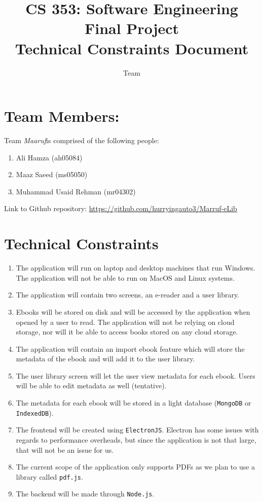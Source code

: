 \documentclass[a4paper, 11pt]{article}
\title{CS 353: Software Engineering \\ {\Large Final Project} \\ {\large Technical Constraints Document}}
\author{Team \Maaruf}
\newcommand{\Maaruf}{\textit{Maaruf}}
\begin{document}
\maketitle
\section{Team Members:}
Team \Maaruf is comprised of the following people:
\begin{enumerate}
    \item Ali Hamza \hspace{5mm} (ah05084)
    \item Maaz Saeed \hspace{5mm} (ms05050)
    \item Muhammad Usaid Rehman  \hspace{3mm} (mr04302)
\end{enumerate}
\vspace{2 mm}
\noindent Link to Github repository: \url{https://github.com/hurryingauto3/Marruf-eLib}

\section{Technical Constraints}


\begin{enumerate}
    \item The application will run on laptop and desktop machines that run Windows. The application will not be able to run on MacOS and Linux systems. 
    \item The application will contain two screens, an e-reader and a user library. 
    \item Ebooks will be stored on disk and will be accessed by the application when opened by a user to read. The application will not be relying on cloud storage, nor will it be able to access books stored on any cloud storage.
    \item The application will contain an import ebook feature which will store the metadata of the ebook and will add it to the user library. 
    \item The user library screen will let the user view metadata for each ebook. Users will be able to edit metadata as well (tentative). 
    \item The metadata for each ebook will be stored in a light database (\texttt{MongoDB} or \texttt{IndexedDB}). 
    \item The frontend will be created using \texttt{ElectronJS}. Electron has some issues with regards to performance overheads, but since the application is not that large, that will not be an issue for us. 
    \item The current scope of the application only supports PDFs as we plan to use a library called \texttt{pdf.js}.
    \item The backend will be made through \texttt{Node.js}.
\end{enumerate}
\end{document}
